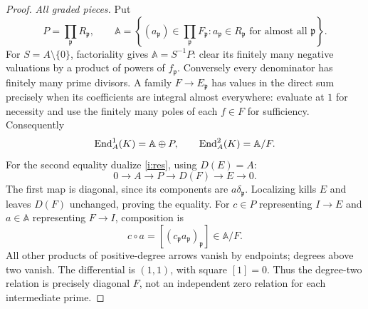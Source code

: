 \begin{proof}
\emph{All graded pieces.}
Put
\[
 P=\prod_{\mathfrak p}R_{\mathfrak p},\qquad
 \mathbb A=\left\{(a_{\mathfrak p})\in\prod_{\mathfrak p} F_{\mathfrak p}:
 a_{\mathfrak p}\in R_{\mathfrak p}\text{ for almost all }\mathfrak p\right\}.
\]
For $S=A\setminus\{0\}$, factoriality gives $\mathbb A=S^{-1}P$:
clear its finitely many negative valuations by a product of powers of
$f_{\mathfrak p}$. Conversely every denominator has finitely many
prime divisors. A family $F\to E_{\mathfrak p}$ has values in the
direct sum precisely when its coefficients are integral almost
everywhere: evaluate at $1$ for necessity and use the finitely many
poles of each $f\in F$ for sufficiency. Consequently
\begin{equation}\label{i:pieces}
 \operatorname{End}_A^1(K)=\mathbb A\oplus P,\qquad
 \operatorname{End}_A^2(K)=\mathbb A/F.
\end{equation}
For the second equality dualize \eqref{i:res}, using $D(E)=A$:
\begin{equation}\label{i:dual}
 0\to A\to P\to D(F)\to E\to0.
\end{equation}
The first map is diagonal, since its components are
$a\delta_{\mathfrak p}$. Localizing kills $E$ and leaves $D(F)$
unchanged, proving the equality. For $c\in P$ representing $I\to E$
and $a\in\mathbb A$ representing $F\to I$, composition is
\begin{equation}\label{i:product}
 c\circ a=[(c_{\mathfrak p}a_{\mathfrak p})_{\mathfrak p}]
                         \in\mathbb A/F.
\end{equation}
All other products of positive-degree arrows vanish by endpoints;
degrees above two vanish. The differential is $(1,1)$, with square
$[1]=0$. Thus the degree-two relation is precisely diagonal $F$,
not an independent zero relation for each intermediate prime.


\end{proof}
